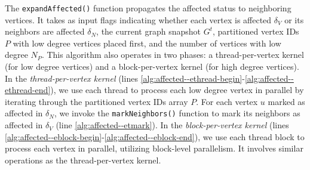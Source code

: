 The \texttt{expandAffected()} function propagates the affected status to neighboring vertices. It takes as input flags indicating whether each vertex is affected $\delta_V$ or its neighbors are affected $\delta_N$, the current graph snapshot $G^t$, partitioned vertex IDs $P$ with low degree vertices placed first, and the number of vertices with low degree $N_P$. This algorithm also operates in two phases: a thread-per-vertex kernel (for low degree vertices) and a block-per-vertex kernel (for high degree vertices). In the \textit{thread-per-vertex kernel} (lines \ref{alg:affected--ethread-begin}-\ref{alg:affected--ethread-end}), we use each thread to process each low degree vertex in parallel by iterating through the partitioned vertex IDs array $P$. For each vertex $u$ marked as affected in $\delta_N$, we invoke the \texttt{markNeighbors()} function to mark its neighbors as affected in $\delta_V$ (line \ref{alg:affected--etmark}). In the \textit{block-per-vertex kernel} (lines \ref{alg:affected--eblock-begin}-\ref{alg:affected--eblock-end}), we use each thread block to process each vertex in parallel, utilizing block-level parallelism. It involves similar operations as the thread-per-vertex kernel.
